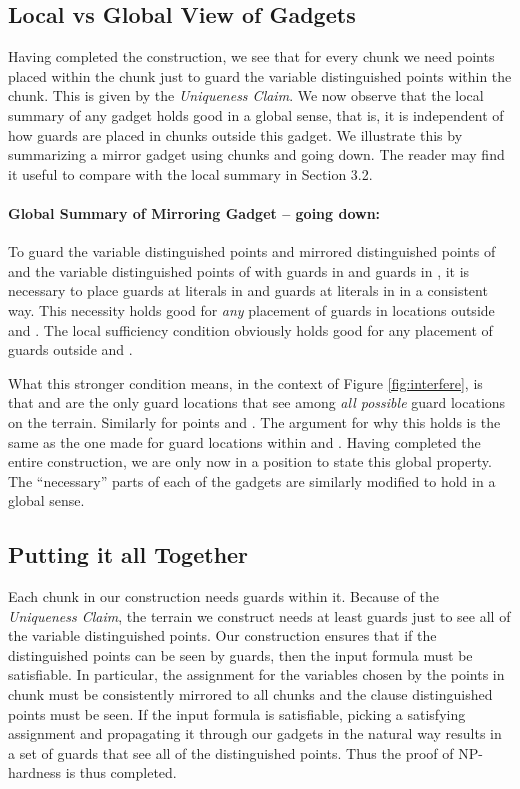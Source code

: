 \documentclass[11pt]{article}
\begin{document}
\subsection{Local vs Global View of Gadgets}

Having completed the construction, we see that for every chunk  we need  points placed within the chunk just to guard the variable distinguished points within the chunk.  This is given by the {\em Uniqueness Claim}.  We now observe that the local summary of any gadget holds good in a global sense, that is, it is independent of how guards are placed in chunks outside this gadget.  We illustrate this by summarizing a mirror gadget using chunks  and  going down.  The reader may find it useful to compare with the local summary in Section 3.2.

\paragraph{Global Summary of Mirroring Gadget -- going down:}  To guard the variable distinguished points and mirrored distinguished points of  and the variable distinguished points of  with  guards in  and  guards in , it is necessary to place  guards at literals in  and  guards at literals in  in a consistent way.  This necessity holds good for {\em any} placement of guards in locations outside  and .  The local sufficiency condition obviously holds good for any placement of guards outside  and .

What this stronger condition means, in the context of Figure \ref{fig:interfere}, is that  and  are the only guard locations that see  among {\em all possible} guard locations on the terrain.  Similarly for points  and .  The argument for why this holds is the same as the one made for guard locations within  and .  Having completed the entire construction, we are only now in a position to state this global property.  The ``necessary'' parts of each of the gadgets are similarly modified to hold in a global sense.

\subsection{Putting it all Together}
Each chunk  in our construction needs  guards within it.  Because of the {\em Uniqueness Claim}, the terrain we construct needs at least  guards just to see all of the variable distinguished points. Our construction ensures that if the distinguished points can be seen by  guards, then the input formula must be satisfiable. In particular, the assignment for the variables chosen by the  points in chunk  must be consistently mirrored to all chunks and the clause distinguished points must be seen.  If the input formula is satisfiable, picking a satisfying assignment and propagating it through our gadgets in the natural way results in a set of  guards that see all of the distinguished points. Thus the proof of NP-hardness is thus completed.
\end{document}
